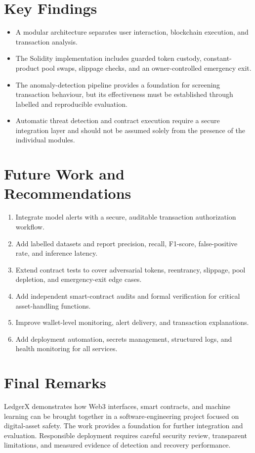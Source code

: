 \documentclass{tietreport}
\begin{document}
\section{Key Findings}
\begin{itemize}
  \item A modular architecture separates user interaction, blockchain
  execution, and transaction analysis.
  \item The Solidity implementation includes guarded token custody,
  constant-product pool swaps, slippage checks, and an owner-controlled
  emergency exit.
  \item The anomaly-detection pipeline provides a foundation for screening
  transaction behaviour, but its effectiveness must be established through
  labelled and reproducible evaluation.
  \item Automatic threat detection and contract execution require a secure
  integration layer and should not be assumed solely from the presence of
  the individual modules.
\end{itemize}

\section{Future Work and Recommendations}
\begin{enumerate}
  \item Integrate model alerts with a secure, auditable transaction
  authorization workflow.
  \item Add labelled datasets and report precision, recall, F1-score,
  false-positive rate, and inference latency.
  \item Extend contract tests to cover adversarial tokens, reentrancy,
  slippage, pool depletion, and emergency-exit edge cases.
  \item Add independent smart-contract audits and formal verification for
  critical asset-handling functions.
  \item Improve wallet-level monitoring, alert delivery, and transaction
  explanations.
  \item Add deployment automation, secrets management, structured logs,
  and health monitoring for all services.
\end{enumerate}

\section{Final Remarks}
LedgerX demonstrates how Web3 interfaces, smart contracts, and machine
learning can be brought together in a software-engineering project focused
on digital-asset safety. The work provides a foundation for further
integration and evaluation. Responsible deployment requires careful
security review, transparent limitations, and measured evidence of
detection and recovery performance.

\printbibliography[heading=bibintoc]
\end{document}
